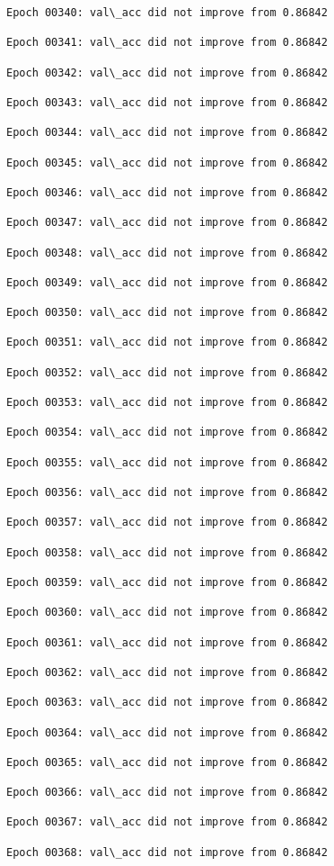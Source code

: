 \documentclass[11pt]{article}
\begin{document}
\begin{Verbatim}[commandchars=\\\{\}]
Epoch 00340: val\_acc did not improve from 0.86842

Epoch 00341: val\_acc did not improve from 0.86842

Epoch 00342: val\_acc did not improve from 0.86842

Epoch 00343: val\_acc did not improve from 0.86842

Epoch 00344: val\_acc did not improve from 0.86842

Epoch 00345: val\_acc did not improve from 0.86842

Epoch 00346: val\_acc did not improve from 0.86842

Epoch 00347: val\_acc did not improve from 0.86842

Epoch 00348: val\_acc did not improve from 0.86842

Epoch 00349: val\_acc did not improve from 0.86842

Epoch 00350: val\_acc did not improve from 0.86842

Epoch 00351: val\_acc did not improve from 0.86842

Epoch 00352: val\_acc did not improve from 0.86842

Epoch 00353: val\_acc did not improve from 0.86842

Epoch 00354: val\_acc did not improve from 0.86842

Epoch 00355: val\_acc did not improve from 0.86842

Epoch 00356: val\_acc did not improve from 0.86842

Epoch 00357: val\_acc did not improve from 0.86842

Epoch 00358: val\_acc did not improve from 0.86842

Epoch 00359: val\_acc did not improve from 0.86842

Epoch 00360: val\_acc did not improve from 0.86842

Epoch 00361: val\_acc did not improve from 0.86842

Epoch 00362: val\_acc did not improve from 0.86842

Epoch 00363: val\_acc did not improve from 0.86842

Epoch 00364: val\_acc did not improve from 0.86842

Epoch 00365: val\_acc did not improve from 0.86842

Epoch 00366: val\_acc did not improve from 0.86842

Epoch 00367: val\_acc did not improve from 0.86842

Epoch 00368: val\_acc did not improve from 0.86842


\end{Verbatim}
\end{document}
